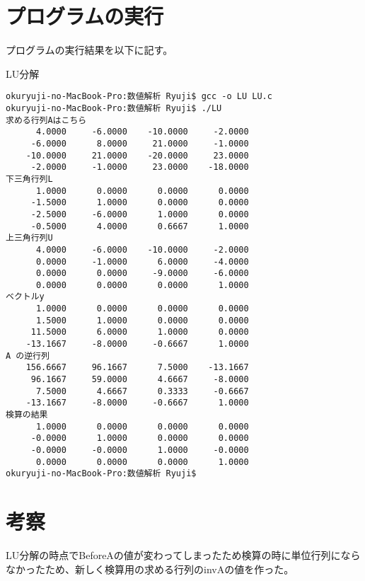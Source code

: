 \documentclass[a4j,titlepage]{jarticle}
\begin{document}
\section{プログラムの実行}
プログラムの実行結果を以下に記す。
\begin{breakitembox}[l]{LU分解} \small
\begin{verbatim}
okuryuji-no-MacBook-Pro:数値解析 Ryuji$ gcc -o LU LU.c
okuryuji-no-MacBook-Pro:数値解析 Ryuji$ ./LU
求める行列Aはこちら
      4.0000     -6.0000    -10.0000     -2.0000
     -6.0000      8.0000     21.0000     -1.0000
    -10.0000     21.0000    -20.0000     23.0000
     -2.0000     -1.0000     23.0000    -18.0000
下三角行列L 
      1.0000      0.0000      0.0000      0.0000
     -1.5000      1.0000      0.0000      0.0000
     -2.5000     -6.0000      1.0000      0.0000
     -0.5000      4.0000      0.6667      1.0000
上三角行列U 
      4.0000     -6.0000    -10.0000     -2.0000
      0.0000     -1.0000      6.0000     -4.0000
      0.0000      0.0000     -9.0000     -6.0000
      0.0000      0.0000      0.0000      1.0000
ベクトルy 
      1.0000      0.0000      0.0000      0.0000
      1.5000      1.0000      0.0000      0.0000
     11.5000      6.0000      1.0000      0.0000
    -13.1667     -8.0000     -0.6667      1.0000
A の逆行列
    156.6667     96.1667      7.5000    -13.1667
     96.1667     59.0000      4.6667     -8.0000
      7.5000      4.6667      0.3333     -0.6667
    -13.1667     -8.0000     -0.6667      1.0000
検算の結果
	  1.0000      0.0000      0.0000      0.0000
     -0.0000      1.0000      0.0000      0.0000
     -0.0000     -0.0000      1.0000     -0.0000
      0.0000      0.0000      0.0000      1.0000
okuryuji-no-MacBook-Pro:数値解析 Ryuji$
\end{verbatim}
\end{breakitembox}

\section{考察}
 LU分解の時点でBeforeAの値が変わってしまったため検算の時に単位行列にならなかったため、新しく検算用の求める行列のinvAの値を作った。
\end{document}
